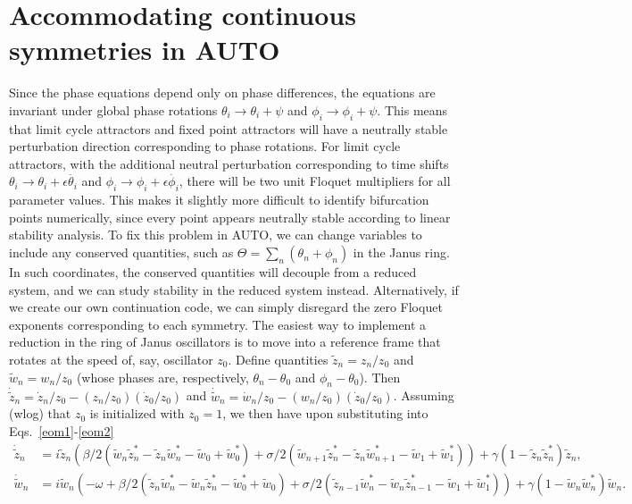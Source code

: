 \documentclass[aps,pre,amsmath,amssymb,floatfix,onecolumn,notitlepage,10pt]{revtex4-1}
\begin{document}
\section{Accommodating continuous symmetries in AUTO}
Since the phase equations depend only on phase differences, the equations are invariant under global phase rotations $\theta_i\to\theta_i+\psi$ and $\phi_i\to \phi_i+\psi$.  This means that limit cycle attractors and fixed point attractors will have a neutrally stable perturbation direction corresponding to phase rotations. For limit cycle attractors, with the additional neutral perturbation corresponding to time shifts $\theta_i\to\theta_i+\epsilon\dot{\theta_i}$ and $\phi_i\to\phi_i+\epsilon\dot{\phi_i}$, there will be two unit Floquet multipliers for all parameter values. This makes it slightly more difficult to identify bifurcation points numerically, since every point appears neutrally stable according to linear stability analysis.  To fix this problem in AUTO, we can change variables to include any conserved quantities, such as $\Theta = \sum_n \left(\theta_n + \phi_n\right)$ in the Janus ring. In such coordinates, the conserved quantities will decouple from a reduced system, and we can study stability in the reduced system instead.   Alternatively, if we create our own continuation code, we can simply disregard the zero Floquet exponents corresponding to each symmetry. The easiest way to implement a reduction in the ring of Janus oscillators is to move into a reference frame that rotates at the speed of, say, oscillator $z_0$. Define quantities $\tilde{z}_n = z_n/z_0$ and $\tilde{w}_n = w_n/z_0$ (whose phases are, respectively, $\theta_n-\theta_0$ and $\phi_n-\theta_0$).  Then $\dot {\tilde z}_n = \dot z_n / z_0 - \left(z_n/z_0\right)\left( \dot z_0/z_0\right)$ and $\dot {\tilde w}_n = \dot w_n / z_0 - \left(w_n/z_0\right) \left(\dot z_0/z_0\right)$. Assuming (wlog) that $z_0$ is initialized with $z_0=1$, we then have upon substituting into Eqs.~\ref{eom1}-\ref{eom2}
\begin{align}
\dot {\tilde z}_n &= i{\tilde z}_n\left(  \beta/2\left({\tilde w}_n{\tilde z}_n^*-{\tilde z}_n{\tilde w}_n^* - {\tilde w}_0+{\tilde w}_0^*\right) + \sigma/2\left({\tilde w}_{n+1}{\tilde z}_n^*-{\tilde z}_n{\tilde w}_{n+1}^* - {\tilde w}_1+{\tilde w}_1^*\right)\right) + \gamma\left(1-{\tilde z}_n{\tilde z}_n^*\right){\tilde z}_n, \\
\dot {\tilde w}_n &= i{\tilde w}_n\left( -\omega + \beta/2\left({\tilde z}_n{\tilde w}_n^*-{\tilde w}_n{\tilde z}_n^* -{\tilde w}_0^*+{\tilde w}_0 \right) + \sigma/2\left({\tilde z}_{n-1}{\tilde w}_n^*-{\tilde w}_n{\tilde z}_{n-1}^* - {\tilde w}_1+{\tilde w}_1^*\right)\right) + \gamma\left(1-{\tilde w}_n{\tilde w}_n^*\right){\tilde w}_n.
\end{align}
\end{document}

